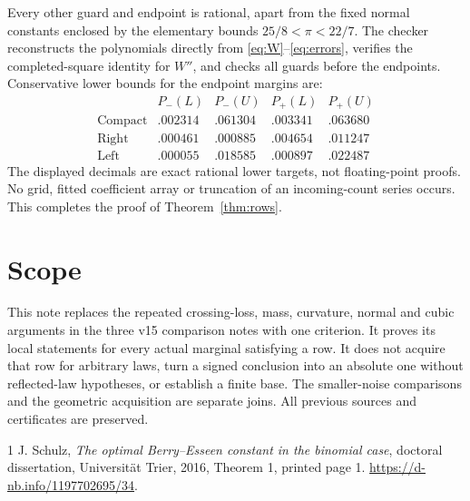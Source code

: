 \documentclass[11pt]{article}
\begin{document}
Every other guard and endpoint is rational, apart from the fixed normal
constants enclosed by the elementary bounds $25/8<\pi<22/7$.
The checker reconstructs the polynomials directly from
\eqref{eq:W}--\eqref{eq:errors}, verifies the completed-square identity for
$W''$, and checks all guards before the endpoints. Conservative lower
bounds for the endpoint margins are:
\[
\begin{array}{c|rrrr}
&P_-(L)&P_-(U)&P_+(L)&P_+(U)\\ \hline
\text{Compact}&.002314&.061304&.003341&.063680\\
\text{Right}&.000461&.000885&.004654&.011247\\
\text{Left}&.000055&.018585&.000897&.022487
\end{array}
\]
The displayed decimals are exact rational lower targets, not floating-point
proofs. No grid, fitted coefficient array or truncation of an incoming-count
series occurs. This completes the proof of Theorem~\ref{thm:rows}.

\section*{Scope}
This note replaces the repeated crossing-loss, mass, curvature, normal and
cubic arguments in the three v15 comparison notes with one criterion.
It proves its local statements for every actual marginal satisfying a row.
It does not acquire that row for arbitrary laws, turn a signed conclusion
into an absolute one without reflected-law hypotheses, or establish a finite
base. The smaller-noise comparisons and the geometric acquisition are
separate joins. All previous sources and certificates are preserved.

\begin{thebibliography}{1}
J. Schulz,
\emph{The optimal Berry--Esseen constant in the binomial case},
doctoral dissertation, Universit\"at Trier, 2016, Theorem 1, printed page 1.
\url{https://d-nb.info/1197702695/34}.
\end{thebibliography}
\end{document}
